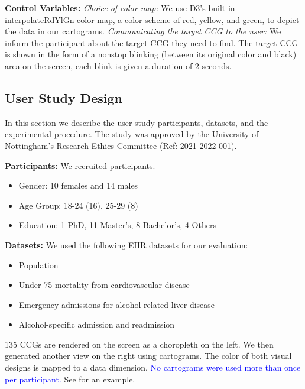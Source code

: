 \documentclass[Afour,sagev,times]{sagej}
\newcommand{\new}[1]{\textcolor{blue}{#1}}
\newcommand{\bobgraph}[1]{\noindent\textbf{#1}}
\begin{document}
\bobgraph{Control Variables: }\textit{Choice of color map:} We use D3's built-in interpolateRdYlGn color map, a color scheme of red, yellow, and green, to depict the data in our cartograms.
\textit{Communicating the target CCG to the user:} We inform the participant about the target CCG they need to find.
The target CCG is shown in the form of a nonstop blinking (between its original color and black) area on the screen, each blink is given a duration of 2 seconds.

\subsection{User Study Design}\label{subsec:{User Study Design}}

In this section we describe the user study participants, datasets, and the experimental procedure.
The study was approved by the University of Nottingham's Research Ethics Committee (Ref: 2021-2022-001).

\bobgraph{Participants:} We recruited \pCount participants.

\begin{itemize}
    \setlength\itemsep{0px}
    \item Gender: 10 females and 14 males
    \item Age Group: 18-24 (16), 25-29 (8)
    \item Education: 1 PhD, 11 Master's, 8 Bachelor's, 4 Others
\end{itemize}

\bobgraph{Datasets:} We used the following EHR datasets for our evaluation:

\begin{itemize}
    \setlength\itemsep{0px}
    \item Population
    \item Under 75 mortality from cardiovascular disease
    \item Emergency admissions for alcohol-related liver disease
    \item Alcohol-specific admission and readmission
\end{itemize}

135 CCGs are rendered on the screen as a choropleth on the left.
We then generated another view on the right using cartograms.
The color of both visual designs is mapped to a data dimension.
\new{No cartograms were used more than once per participant.}
See  for an example.
\end{document}
